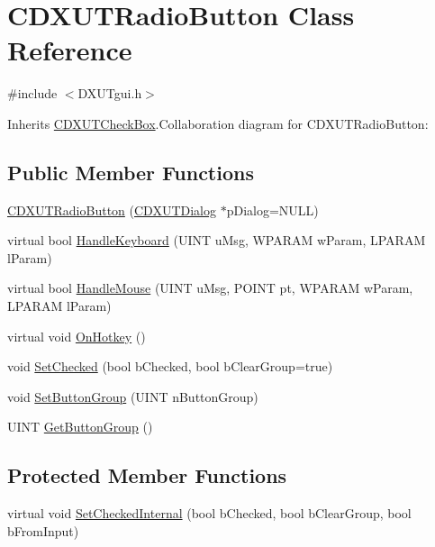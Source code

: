 \hypertarget{class_c_d_x_u_t_radio_button}{
\section{CDXUTRadioButton Class Reference}
\label{class_c_d_x_u_t_radio_button}
}


{\ttfamily \#include $<$DXUTgui.h$>$}

Inherits \hyperlink{class_c_d_x_u_t_check_box}{CDXUTCheckBox}.Collaboration diagram for CDXUTRadioButton:\subsection*{Public Member Functions}
\begin{DoxyCompactItemize}
\item 
\hyperlink{class_c_d_x_u_t_radio_button_af6c3e04158bd02fd01c2328b951db366}{CDXUTRadioButton} (\hyperlink{class_c_d_x_u_t_dialog}{CDXUTDialog} $\ast$pDialog=NULL)
\item 
virtual bool \hyperlink{class_c_d_x_u_t_radio_button_a221492c2a117d1faaab749c1f3a88a4d}{HandleKeyboard} (UINT uMsg, WPARAM wParam, LPARAM lParam)
\item 
virtual bool \hyperlink{class_c_d_x_u_t_radio_button_aab0a615727913f7f6c8e8d35cc2220e6}{HandleMouse} (UINT uMsg, POINT pt, WPARAM wParam, LPARAM lParam)
\item 
virtual void \hyperlink{class_c_d_x_u_t_radio_button_a2950447936727f33130fa4f6928045ac}{OnHotkey} ()
\item 
void \hyperlink{class_c_d_x_u_t_radio_button_a697cac8fe1c233671808252e9407f0ac}{SetChecked} (bool bChecked, bool bClearGroup=true)
\item 
void \hyperlink{class_c_d_x_u_t_radio_button_ae9aeefdd748214afa0568bdb5ebadfbc}{SetButtonGroup} (UINT nButtonGroup)
\item 
UINT \hyperlink{class_c_d_x_u_t_radio_button_a1b2f6d3405e49d94720ada2dda07dc20}{GetButtonGroup} ()
\end{DoxyCompactItemize}
\subsection*{Protected Member Functions}
\begin{DoxyCompactItemize}
\item 
virtual void \hyperlink{class_c_d_x_u_t_radio_button_acf255e4bd5ace345d6cacd01621a7000}{SetCheckedInternal} (bool bChecked, bool bClearGroup, bool bFromInput)
\end{DoxyCompactItemize}
